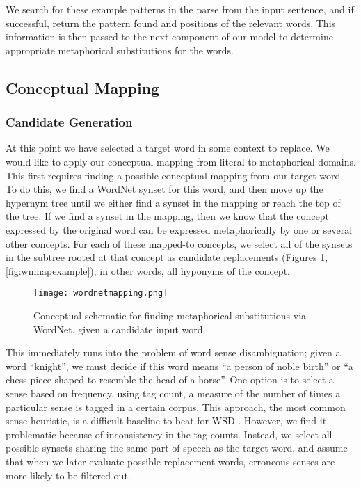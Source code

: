 \documentclass[12pt]{article}
\begin{document}
We search for these example patterns in the parse from the input sentence, and if successful, return the pattern found and positions of the relevant words.  This information is then passed to the next component of our model to determine appropriate metaphorical substitutions for the words.

\subsection{Conceptual Mapping}

\subsubsection{Candidate Generation}

At this point we have selected a target word in some context to replace. We would like to apply our conceptual mapping from literal to metaphorical domains. This first requires finding a possible conceptual mapping from our target word. To do this, we find a WordNet synset for this word, and then move up the hypernym tree until we either find a synset in the mapping or reach the top of the tree. If we find a synset in the mapping, then we know that the concept expressed by the original word can be expressed metaphorically by one or several other concepts. For each of these mapped-to concepts, we select all of the synsets in the subtree rooted at that concept as candidate replacements (Figures \ref{fig:wnmapping}, \ref{fig:wnmapexample}); in other words, all hyponyms of the concept.

\begin{figure}[h]
	\centering
	\texttt{[image: wordnetmapping.png]}
	\caption{Conceptual schematic for finding metaphorical substitutions via WordNet, given a candidate input word.}
	\label{fig:wnmapping}
\end{figure}

This immediately runs into the problem of word sense disambiguation; given a word ``knight'', we must decide if this word means ``a person of noble birth'' or ``a chess piece shaped to resemble the head of a horse''. One option is to select a sense based on frequency, using tag count, a measure of the number of times a particular sense is tagged in a certain corpus. This approach, the most common sense heuristic, is a difficult baseline to beat for WSD \cite{mccarthy}. However, we find it problematic because of inconsistency in the tag counts. Instead, we select all possible synsets sharing the same part of speech as the target word, and assume that when we later evaluate possible replacement words, erroneous senses are more likely to be filtered out.
\end{document}
